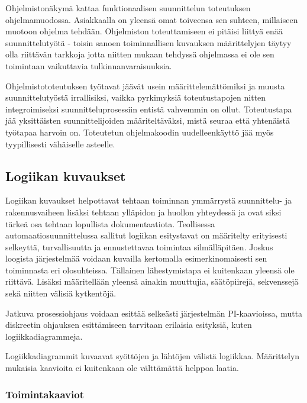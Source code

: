 \documentclass[finnish,12pt]{article}
\begin{document}
Ohjelmistonäkymä kattaa funktionaalisen suunnittelun toteutuksen ohjelmamuodossa.
Asiakkaalla on yleensä omat toiveensa sen suhteen, millaiseen muotoon ohjelma tehdään.
Ohjelmiston toteuttamiseen ei pitäisi liittyä enää suunnittelutyötä - toisin sanoen toiminnallisen kuvauksen määrittelyjen täytyy olla riittävän tarkkoja jotta niitten mukaan tehdyssä ohjelmassa ei ole sen toimintaan vaikuttavia tulkinnanvaraisuuksia.

Ohjelmistototeutuksen työtavat jäävät usein määrittelemättömiksi ja muusta suunnittelutyöstä irrallisiksi,
vaikka pyrkimyksiä toteutustapojen nitten integroimiseksi suunnitteluprosessiin entistä vahvemmin on ollut.
Toteutustapa jää yksittäisten suunnittelijoiden määriteltäväksi, mistä seuraa että yhtenäistä työtapaa harvoin on.
Toteutetun ohjelmakoodin uudelleenkäyttö jää myös tyypillisesti vähäiselle asteelle. \cite{RefWorks:42}


	\subsection{Logiikan kuvaukset}


Logiikan kuvaukset helpottavat tehtaan toiminnan ymmärrystä suunnittelu- ja rakennusvaiheen lisäksi tehtaan ylläpidon ja huollon yhteydessä ja ovat siksi tärkeä osa tehtaan lopullista dokumentaatiota.
Teollisessa automaatiosuunnittelussa sallitut logiikan esitystavat on määritelty erityisesti selkeyttä, turvallisuutta ja ennustettavaa toimintaa silmälläpitäen.
Joskus loogista järjestelmää voidaan kuvailla kertomalla esimerkinomaisesti sen toiminnasta eri olosuhteissa.
Tällainen lähestymistapa ei kuitenkaan yleensä ole riittävä.
Lisäksi määritellään yleensä ainakin muuttujia, säätöpiirejä, sekvenssejä sekä niitten välisiä kytkentöjä.\cite{RefWorks:41}

Jatkuva prosessiohjaus voidaan esittää selkeästi järjestelmän PI-kaavioissa, mutta diskreetin ohjauksen esittämiseen tarvitaan erilaisia esityksiä, kuten logiikkadiagrammeja. \cite{RefWorks:54}

Logiikkadiagrammit kuvaavat syöttöjen ja lähtöjen välistä logiikkaa.
Määrittelyn mukaisia kaavioita ei kuitenkaan ole välttämättä helppoa laatia.

		\subsubsection{Toimintakaaviot}
\end{document}
